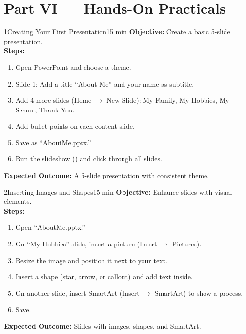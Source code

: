\chapter{Part VI --- Hands-On Practicals}
\label{ch:lab6}


\begin{labactivity}{1}{Creating Your First Presentation}{15 min}
\textbf{Objective:} Create a basic 5-slide presentation.\\[4pt]
\textbf{Steps:}
\begin{enumerate}[label=\protect\stepcircle{\arabic*}, leftmargin=2cm, itemsep=4pt]
  \item Open PowerPoint and choose a theme.
  \item Slide 1: Add a title ``About Me'' and your name as subtitle.
  \item Add 4 more slides (Home $\rightarrow$ New Slide): My Family, My Hobbies, My School, Thank You.
  \item Add bullet points on each content slide.
  \item Save as ``AboutMe.pptx.''
  \item Run the slideshow () and click through all slides.
\end{enumerate}
\textbf{Expected Outcome:} A 5-slide presentation with consistent theme.
\welldone
\end{labactivity}

\begin{labactivity}{2}{Inserting Images and Shapes}{15 min}
\textbf{Objective:} Enhance slides with visual elements.\\[4pt]
\textbf{Steps:}
\begin{enumerate}[label=\protect\stepcircle{\arabic*}, leftmargin=2cm, itemsep=4pt]
  \item Open ``AboutMe.pptx.''
  \item On ``My Hobbies'' slide, insert a picture (Insert $\rightarrow$ Pictures).
  \item Resize the image and position it next to your text.
  \item Insert a shape (star, arrow, or callout) and add text inside.
  \item On another slide, insert SmartArt (Insert $\rightarrow$ SmartArt) to show a process.
  \item Save.
\end{enumerate}
\textbf{Expected Outcome:} Slides with images, shapes, and SmartArt.
\welldone
\end{labactivity}

